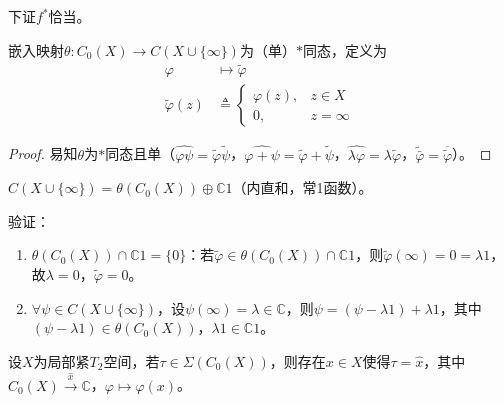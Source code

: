 \documentclass[lang=cn,a4paper,newtx,section]{elegantbook}
\begin{document}
\begin{remark}
  下证$f^*$恰当。
\end{remark}

\begin{proposition}
  嵌入映射$\theta: C_0(X) \to C(X \cup \{\infty\})$为（单）$*$同态，定义为
  \begin{equation*}
    \begin{aligned}
      \varphi &\longmapsto \tilde{\varphi} \\
      \tilde{\varphi}(z) &\triangleq \begin{cases}
        \varphi(z), & z \in X \\
        0, & z = \infty
      \end{cases}
    \end{aligned}
  \end{equation*}
\end{proposition}

\begin{proof}
  易知$\theta$为$*$同态且单（$\widehat{\varphi\psi} = \tilde{\varphi}\tilde{\psi}$，$\widehat{\varphi + \psi} = \tilde{\varphi} + \tilde{\psi}$，$\widehat{\lambda\varphi} = \lambda\tilde{\varphi}$，$\widetilde{\bar{\varphi}} = \overline{\tilde{\varphi}}$）。
\end{proof}

\begin{remark}
  $C(X \cup \{\infty\}) = \theta(C_0(X)) \oplus \mathbb{C}1$（内直和，常1函数）。
  
  验证：
  \begin{enumerate}
    \item $\theta(C_0(X)) \cap \mathbb{C}1 = \{0\}$：若$\tilde{\varphi} \in \theta(C_0(X)) \cap \mathbb{C}1$，则$\tilde{\varphi}(\infty) = 0 = \lambda 1$，故$\lambda = 0$，$\tilde{\varphi} = 0$。
    \item $\forall \psi \in C(X \cup \{\infty\})$，设$\psi(\infty) = \lambda \in \mathbb{C}$，则$\psi = (\psi - \lambda 1) + \lambda 1$，其中$(\psi - \lambda 1) \in \theta(C_0(X))$，$\lambda 1 \in \mathbb{C}1$。
  \end{enumerate}
\end{remark}

\begin{lemma}
  设$X$为局部紧$T_2$空间，若$\tau \in \Sigma(C_0(X))$，则存在$x \in X$使得$\tau = \hat{x}$，其中$C_0(X) \xrightarrow{\hat{x}} \mathbb{C}$，$\varphi \longmapsto \varphi(x)$。
\end{lemma}
\end{document}
